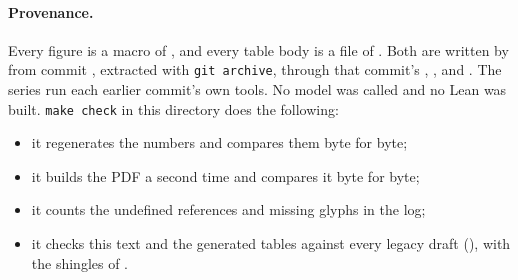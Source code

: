 \paragraph{Provenance.} Every figure is a macro of , and every table
body is a file of . Both are written by 
from commit \texttt{\progRev}, extracted with \texttt{git archive}, through that commit's
, ,  and
. The series run each earlier commit's own tools. No model was
called and no Lean was built. \texttt{make check} in this directory does the following:
\begin{itemize}
\item it regenerates the numbers and compares them byte for byte;
\item it builds the PDF a second time and compares it byte for byte;
\item it counts the undefined references and missing glyphs in the log;
\item it checks this text and the generated tables against every legacy draft
  (), with the shingles of .
\end{itemize}


